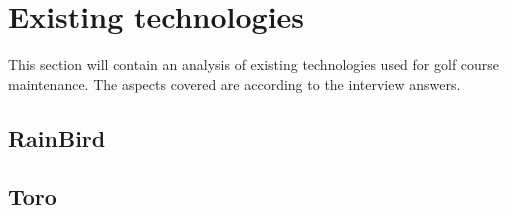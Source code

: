 \section{Existing technologies}
This section will contain an analysis of existing technologies used for golf course maintenance. The aspects covered are according to the interview answers.

\subsection{RainBird}
\subsection{Toro}